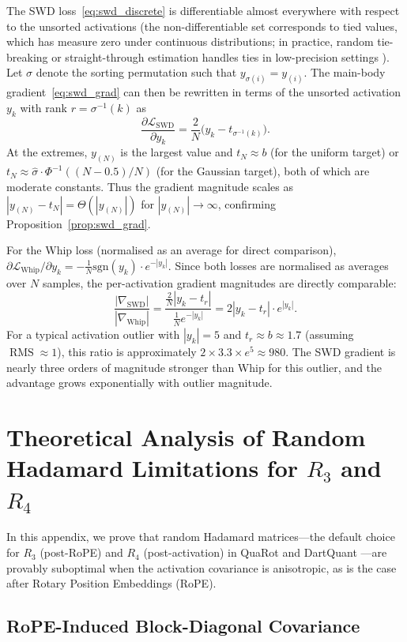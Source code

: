 \documentclass[11pt,a4paper]{article}
\DeclareMathOperator{\RMS}{RMS}
\begin{document}
The SWD loss~\eqref{eq:swd_discrete} is differentiable almost everywhere with respect to the unsorted activations (the non-differentiable set corresponds to tied values, which has measure zero under continuous distributions; in practice, random tie-breaking or straight-through estimation handles ties in low-precision settings \cite{blondel2020}).
Let $\sigma$ denote the sorting permutation such that $y_{\sigma(i)} = y_{(i)}$.
The main-body gradient~\eqref{eq:swd_grad} can then be rewritten in terms of the unsorted activation $y_k$ with rank $r = \sigma^{-1}(k)$ as
\[
\frac{\partial \mathcal{L}_{\text{SWD}}}{\partial y_k}
= \frac{2}{N}\bigl(y_k - t_{\sigma^{-1}(k)}\bigr).
\]
At the extremes, $y_{(N)}$ is the largest value and $t_N \approx b$ (for the uniform target) or $t_N \approx \hat{\sigma} \cdot \Phi^{-1}((N-0.5)/N)$ (for the Gaussian target), both of which are moderate constants.
Thus the gradient magnitude scales as $|y_{(N)} - t_N| = \Theta(|y_{(N)}|)$ for $|y_{(N)}| \to \infty$, confirming Proposition~\ref{prop:swd_grad}.

For the Whip loss (normalised as an average for direct comparison), $\partial \mathcal{L}_{\text{Whip}} / \partial y_k = -\frac{1}{N}\text{sgn}(y_k) \cdot e^{-|y_k|}$.
Since both losses are normalised as averages over $N$ samples, the per-activation gradient magnitudes are directly comparable:
\[
\frac{|\nabla_{\text{SWD}}|}{|\nabla_{\text{Whip}}|}
= \frac{\frac{2}{N}|y_k - t_r|}{\frac{1}{N}e^{-|y_k|}}
= 2|y_k - t_r| \cdot e^{|y_k|}.
\]
For a typical activation outlier with $|y_k| = 5$ and $t_r \approx b \approx 1.7$ (assuming $\RMS \approx 1$), this ratio is approximately $2 \times 3.3 \times e^5 \approx 980$.
The SWD gradient is nearly three orders of magnitude stronger than Whip for this outlier, and the advantage grows exponentially with outlier magnitude.


\section{Theoretical Analysis of Random Hadamard Limitations for $R_3$ and $R_4$}
\label{app:hadamard}

In this appendix, we prove that random Hadamard matrices---the default choice for $R_3$ (post-RoPE) and $R_4$ (post-activation) in QuaRot \cite{quarot} and DartQuant \cite{dartquant}---are provably suboptimal when the activation covariance is anisotropic, as is the case after Rotary Position Embeddings (RoPE).

\subsection{RoPE-Induced Block-Diagonal Covariance}
\label{app:rope_cov}
\end{document}
